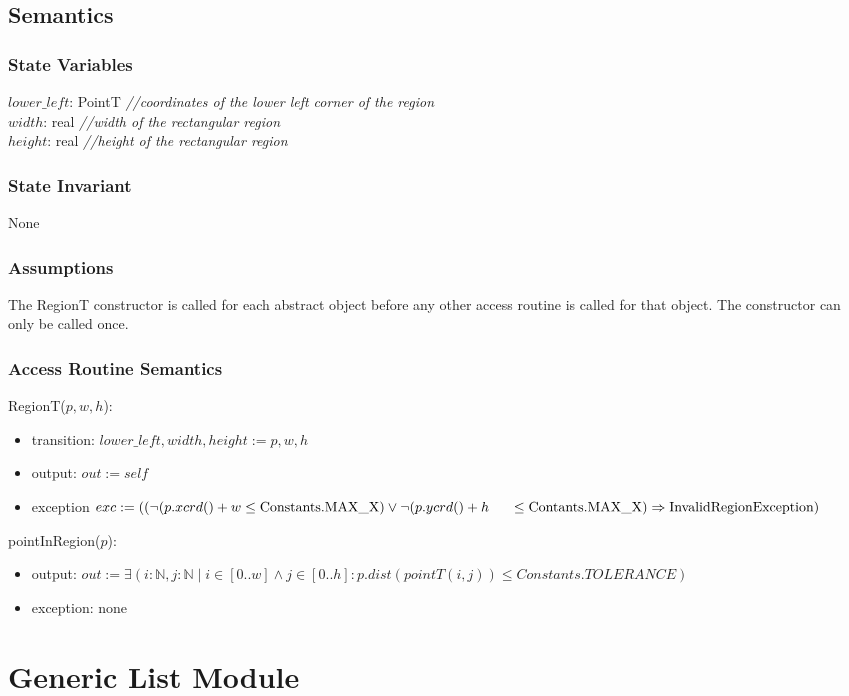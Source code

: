 \documentclass[12pt]{article}
\begin{document}
\subsection* {Semantics}
\subsubsection* {State Variables}
$\mathit{lower\_left}$: PointT {\it //coordinates of the lower left corner of the region}\\
$\mathit{width}$: real {\it //width of the rectangular region}\\
$\mathit{height}$: real {\it //height of the rectangular region}
\subsubsection* {State Invariant}
None
\subsubsection* {Assumptions}
The RegionT constructor is called for each abstract object before any other access routine is called for that
object.  The constructor can only be called once.
\subsubsection* {Access Routine Semantics}
\noindent RegionT($p, w, h$):
\begin{itemize}
\item transition: $\mathit{lower\_left}, \mathit{width}, \mathit{height} := p, w, h$
\item output: $out := \mathit{self}$
\item exception $exc := ((\neg(p.xcrd()+w \leq \mbox{Constants.MAX\_X}) \vee \neg(p.ycrd()+h \\ \indent \leq \mbox{Contants.MAX\_X}) \Rightarrow \mbox{InvalidRegionException})$\\
\end{itemize}
\noindent pointInRegion($p$):
\begin{itemize}
\item output: $\mathit{out} := \exists(i:\mathbb{N}, j:\mathbb{N}  \mid i \in [0..w] \wedge j \in [0..h] : p.dist(pointT(i,j)) \leq Constants.TOLERANCE)$\\
\item exception: none
\end{itemize}
\newpage


\section* {Generic List Module}
\end{document}
